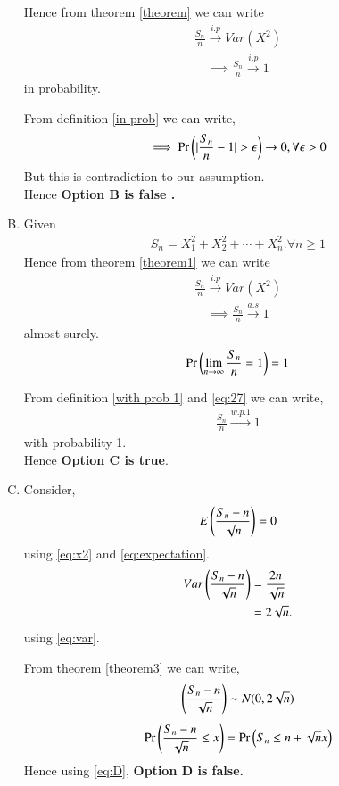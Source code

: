 \documentclass[journal,12pt,twocolumn]{IEEEtran}
\begin{document}
\begin{enumerate}[(A)]
Hence from theorem \ref{theorem} we can write 
\begin{align}
    \frac{S_n}{n} \xrightarrow{i.p} Var(X^2)
\end{align}
\begin{align}
    \implies \frac{S_n}{n} \xrightarrow{i.p} 1
\end{align}
in probability.

From definition \ref{in prob} we can write,
\begin{align}
    \implies \Pr{\ensuremath{\left(\vert\frac{S_n}{n}-1\vert>\epsilon\right)}}\to 0,\forall \epsilon>0
\end{align}
But this is contradiction to our assumption.\\
Hence \textbf{Option B is false .}
 
 
 
 \item Given 
\begin{align}
    S_{n}=X_{1}^2+X_{2}^2+\cdots+X_{n}^2.\forall n\geq 1
\end{align}
Hence from theorem \ref{theorem1} we can write 
\begin{align}
    \frac{S_n}{n} \xrightarrow{i.p} Var(X^2)
\end{align}
\begin{align}
    \implies \frac{S_n}{n} \xrightarrow{a.s} 1
\end{align}
almost surely.
\begin{align}
    \Pr\left(\lim_{n\to \infty}\frac{S_n}{n}=1\right)=1\label{eq:27}
\end{align}


From definition \ref{with prob 1} and \eqref{eq:27} we can write,
\begin{align}
    \frac{S_{n}}{n} \xrightarrow{w.p.1} 1
\end{align}
with probability 1.\\
Hence \textbf{Option C is true}.



\item Consider,
\begin{align}
    E\left(\frac{S_{n}-n}{\sqrt{n}}\right)=0
\end{align}
using \eqref{eq:x2} and \eqref{eq:expectation}.
\begin{align}
     Var\left(\frac{S_{n}-n}{\sqrt{n}}\right)&=\frac{2n}{\sqrt{n}}\\
     &=2\sqrt{n}.
\end{align}
using \eqref{eq:var}.

From theorem \ref{theorem3} we can write,
\begin{align}
    \left(\frac{S_{n}-n}{\sqrt{n}}\right) \sim N(0,2 \sqrt{n})\label{eq:D}
\end{align}
\begin{align}
     \Pr{\ensuremath{\left(\frac{S_{n}-n}{\sqrt{n}} \leq x\right)}}= \Pr{\ensuremath{\left(S_{n} \leq n+\sqrt{n}x\right)}}
\end{align}
Hence using \eqref{eq:D}, \textbf{Option D is false.}
 
 \end{enumerate}
    
\end{document}
